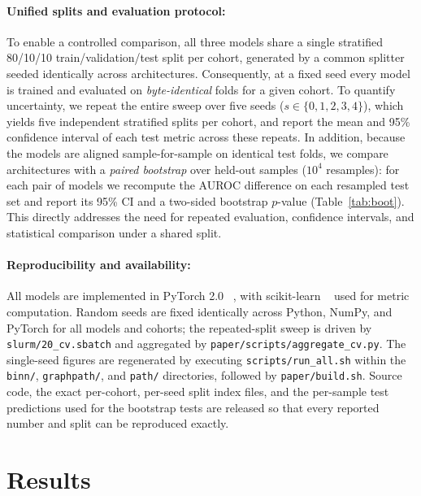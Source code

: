 \documentclass[sigconf]{acmart}
\begin{document}
\paragraph{Unified splits and evaluation protocol:}
To enable a controlled comparison, all three models share a single
stratified 80/10/10 train/validation/test split per cohort, generated by a
common splitter seeded identically across architectures. Consequently, at a
fixed seed every model is trained and evaluated on \emph{byte-identical}
folds for a given cohort. To quantify uncertainty, we repeat the entire
sweep over five seeds ($s \in \{0,1,2,3,4\}$), which yields five independent
stratified splits per cohort, and report the mean and 95\% confidence
interval of each test metric across these repeats. In addition, because the
models are aligned sample-for-sample on identical test folds, we compare
architectures with a \emph{paired bootstrap} over held-out samples
($10^{4}$ resamples): for each pair of models we recompute the AUROC
difference on each resampled test set and report its 95\% CI and a two-sided
bootstrap $p$-value (Table~\ref{tab:boot}). This directly addresses the need
for repeated evaluation, confidence intervals, and statistical comparison
under a shared split.

\paragraph{Reproducibility and availability:}
All models are implemented in PyTorch 2.0 ~\cite{paszke2019pytorch}, with scikit-learn ~\cite{pedregosa2011sklearn} used for
metric computation. Random seeds are fixed identically across Python,
NumPy, and PyTorch for all models and cohorts; the repeated-split sweep is
driven by \texttt{slurm/20\_cv.sbatch} and aggregated by
\texttt{paper/scripts/aggregate\_cv.py}. The single-seed figures are
regenerated by executing \texttt{scripts/run\_all.sh} within the
\texttt{binn/}, \texttt{graphpath/}, and \texttt{path/} directories,
followed by \texttt{paper/build.sh}. Source code, the exact per-cohort,
per-seed split index files, and the per-sample test predictions used for the
bootstrap tests are released so that every reported number and split can be
reproduced exactly.

\section{Results}
\end{document}
